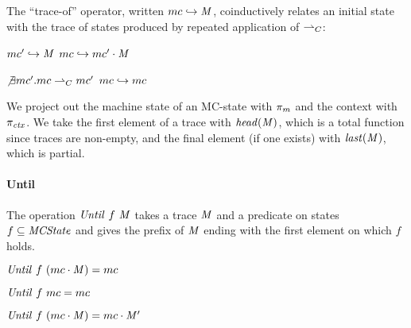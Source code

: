 \documentclass[10pt,conference]{ieeetran}%
\theoremstyle{definition}
\begin{document}
The ``trace-of'' operator, written \(mc \hookrightarrow \mathit{M}\),
coinductively relates an initial state with the trace of states
produced by repeated application of \(\overset{}{\rightharpoonup}_C\):
%
\vspace{-\bigskipamount}
\begin{center}
\begin{minipage}[t]{.6\columnwidth}
            {\(mc' \hookrightarrow \mathit{M}\)}
            {\(mc \hookrightarrow mc' \cdot \mathit{M}\)}%
\end{minipage}
\begin{minipage}[t]{.35\columnwidth}
\judgment%
         {\(\not\exists mc'. mc \overset{}{\rightharpoonup}_C mc'\)}
         {\(mc \hookrightarrow mc\)}
\end{minipage}
\end{center}
\vspace{-\smallskipamount}

We project out the machine state of an MC-state with \(\pi_m\)
and the context with \(\pi_{\mathit{ctx}}\).
We take the first element of a trace with \(\mathit{head}(\mathit{M})\), which is a total
function since traces are non-empty, and the final element (if one exists) with
\(\mathit{last}(\mathit{M})\), which is partial.

\paragraph*{Until}
The operation \(\mathit{Until} ~ f ~ \mathit{M}\) takes a trace \(\mathit{M}\)
and a predicate on states \(f \subseteq \mathit{MCState}\) and gives the prefix of
\(\mathit{M}\) ending with the first element on which \(f\) holds.

\vspace{-\medskipamount}
\begin{center}
  \begin{minipage}[b]{.5\columnwidth}
             {\(\mathit{Until} ~ f ~ (mc \cdot \mathit{M}) = mc\)}
  \end{minipage}
%
  \begin{minipage}[b]{.3\columnwidth}
    \judgment{}
             {\(\mathit{Until} ~ f ~ mc = mc\)}
%
  \end{minipage}
\end{center}
                {\(\mathit{Until} ~ f ~ (mc \cdot \mathit{M}) = mc \cdot \mathit{M}'\)}
\end{document}
